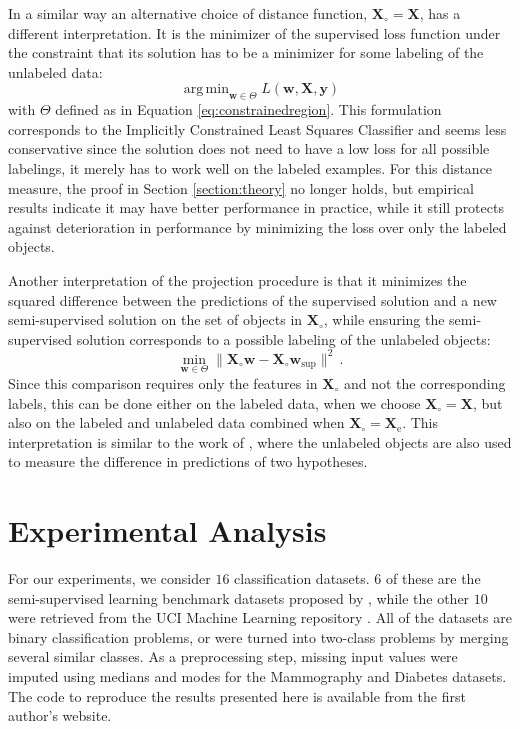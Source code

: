\documentclass[sts,preprint]{imsart-custom}
\newcommand{\Xe}{\vec{X}_\mathrm{e}  }
\renewcommand{\vec}[1]{\mathbf{#1}}
\DeclareMathOperator*{\argmin}{arg\,min}
\begin{document}
In a similar way an alternative choice of distance function, $\vec{X}_{\circ}=\vec{X}$, has a different interpretation. It is the minimizer of the supervised loss function under the constraint that its solution has to be a minimizer for some labeling of the unlabeled data:
\begin{equation}
\argmin_{\vec{w} \in \Theta} L(\vec{w},\vec{X},\vec{y}) \nonumber
\end{equation}
with $\Theta$ defined as in Equation \eqref{eq:constrainedregion}. This formulation corresponds to the Implicitly Constrained Least Squares Classifier \citep{Krijthe2015} and seems less conservative since the solution does not need to have a low loss for all possible labelings, it merely has to work well on the labeled examples. For this distance measure, the proof in Section \ref{section:theory} no longer holds, but empirical results indicate it may have better performance in practice, while it still protects against deterioration in performance by minimizing the loss over only the labeled objects.

Another interpretation of the projection procedure is that it minimizes the squared difference between the predictions of the supervised solution and a new semi-supervised solution on the set of objects in $\vec{X}_{\circ}$, while ensuring the semi-supervised solution corresponds to a possible labeling of the unlabeled objects:
\begin{equation}
\min_{\vec{w} \in \Theta} \lVert \vec{X}_{\circ} \vec{w} - \vec{X}_{\circ} \vec{w}_\text{sup} \lVert^2 \,.\nonumber
\end{equation}
Since this comparison requires only the features in $\vec{X}_{\circ}$ and not the corresponding labels, this can be done either on the labeled data, when we choose $\vec{X}_{\circ}=\vec{X}$, but also on the labeled and unlabeled data combined when $\vec{X}_{\circ}=\Xe$. This interpretation is similar to the work of \cite{Schuurmans2002}, where the unlabeled objects are also used to measure the difference in predictions of two hypotheses. 

\section{Experimental Analysis}
\label{section:empirical}
For our experiments, we consider $16$ classification datasets. $6$ of these are the semi-supervised learning benchmark datasets proposed by \citet{Chapelle2006}, while the other $10$ were retrieved from the UCI Machine Learning repository \citep{Bache2013}. All of the datasets are binary classification problems, or were turned into two-class problems by merging several similar classes. As a preprocessing step, missing input values were imputed using medians and modes for the Mammography and Diabetes datasets. The code to reproduce the results presented here is available from the first author's website.
\end{document}
